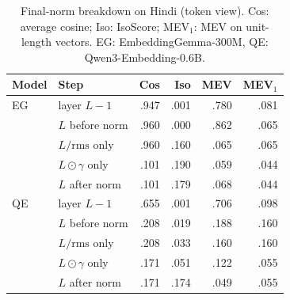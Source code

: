 \begin{table}[t]
\centering
\footnotesize
\setlength{\tabcolsep}{3pt}
\begin{tabular}{llrrrr}
\toprule
Model & Step & Cos & Iso & MEV & MEV$_1$ \\
\midrule
EG & layer $L-1$ & .947 & .001 & .780 & .081 \\
 & $L$ before norm & .960 & .000 & .862 & .065 \\
 & $L / \mathrm{rms}$ only & .960 & .160 & .065 & .065 \\
 & $L \odot \gamma$ only & .101 & .190 & .059 & .044 \\
 & $L$ after norm & .101 & .179 & .068 & .044 \\
\midrule
QE & layer $L-1$ & .655 & .001 & .706 & .098 \\
 & $L$ before norm & .208 & .019 & .188 & .160 \\
 & $L / \mathrm{rms}$ only & .208 & .033 & .160 & .160 \\
 & $L \odot \gamma$ only & .171 & .051 & .122 & .055 \\
 & $L$ after norm & .171 & .174 & .049 & .055 \\
\bottomrule
\end{tabular}
\caption{Final-norm breakdown on Hindi (token view). Cos: average cosine; Iso: IsoScore; MEV$_1$: MEV on unit-length vectors. EG: EmbeddingGemma-300M, QE: Qwen3-Embedding-0.6B.}
\label{tab:app1_norm_breakdown}
\end{table}

